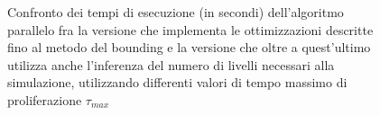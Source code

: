 \begin{figure}[h]
    \centering
    \caption{Confronto dei tempi di esecuzione (in secondi) dell'algoritmo
    parallelo fra la versione che implementa le ottimizzazioni descritte fino al
    metodo del bounding
    e la versione che oltre a quest'ultimo utilizza anche l'inferenza del numero
    di livelli necessari alla simulazione,
    utilizzando differenti valori di tempo massimo di proliferazione
    $\tau_{max}$}
    \label{chart:bounding-inference}
\end{figure}


